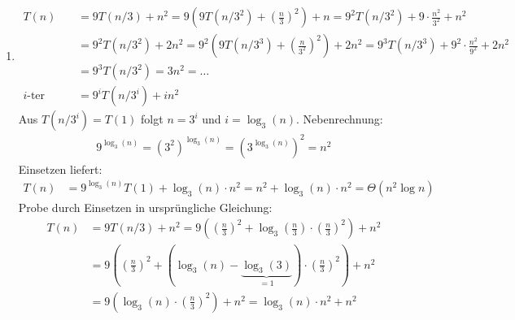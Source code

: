 \documentclass[11pt,a4paper]{article}
\begin{document}
\begin{loesung}
\begin{enumerate}
\begin{enumerate}[label=\roman*)]
        \item
        \begin{align*}
            T(n) &= 9T(n / 3) + n^2 = 9 \left(9T(n / 3^2) + \left(\frac{n}{3}\right)^2 \right) + n = 9^2 T(n / 3^2) + 9 \cdot \frac{n^2}{3^2} + n^2 \\
            &= 9^2 T(n / 3^2) + 2 n^2 
            = 9^2\left(9T(n / 3^3) + \left(\frac{n}{3^2}\right)^2\right) + 2n^2
            = 9^3T(n / 3^3) + 9^2 \cdot \frac{n^2}{9^2} + 2n^2 \\
            &= 9^3T(n / 3^2) = 3n^2 = \ldots \\
            \text{$i$-ter Schritt: } &= 9^i T(n / 3^i) + i n^2
        \end{align*}
        Aus $T(n / 3^i) = T(1)$ folgt $n = 3^i$ und $i = \log_3(n)$. Nebenrechnung:
        \begin{align*}
            9^{\log_3(n)} = \left(3^2\right)^{\log_3(n)} = \left(3^{\log_3(n)}\right)^{2} = n^2
        \end{align*}
        Einsetzen liefert:
        \begin{align*}
            T(n) &= 9^{\log_3(n)} T(1) + \log_3(n) \cdot n^2 = n^2 + \log_3(n) \cdot n^2 = \Theta(n^2 \log n)
        \end{align*}
        Probe durch Einsetzen in ursprüngliche Gleichung:
        \begin{align*}
            T(n) &= 9T(n / 3) + n^2 = 9\left(\left(\frac{n}{3}\right)^2 + \log_3\left(\frac{n}{3}\right) \cdot \left(\frac{n}{3}\right)^2 \right) + n^2 \\
            &= 9\left(\left(\frac{n}{3}\right)^2 + \left(\log_3(n) - \underbrace{\log_3(3)}_{=1} \right) \cdot \left(\frac{n}{3}\right)^2 \right) + n^2 \\
            &= 9 \left( \log_3(n) \cdot \left(\frac{n}{3}\right)^2 \right) + n^2 
            = \log_3(n) \cdot n^2 + n^2
        \end{align*}

\end{enumerate}
\end{enumerate}
\end{loesung}
\end{document}
